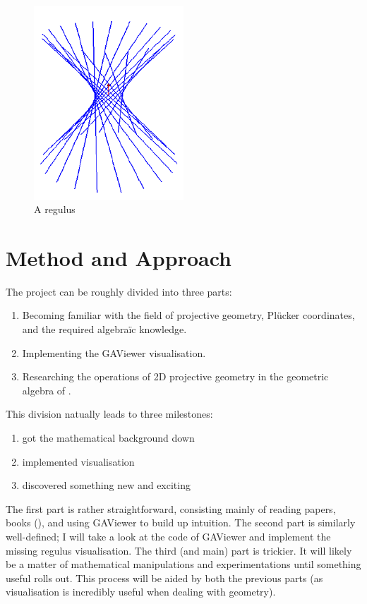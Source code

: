 \documentclass[a4paper, 10pt]{article}
\begin{document}
\begin{figure}[htbp]
  \centering
  \includegraphics[width=0.5\textwidth]{regulus.png}
  \caption{A regulus}
  \label{fig:regulus}
\end{figure}

\section{Method and Approach}
The project can be roughly divided into three parts:
\begin{enumerate}
\item Becoming familiar with the field of projective geometry, Pl\"{u}cker
  coordinates, and the required algebra\"{i}c knowledge.
\item Implementing the GAViewer visualisation.
\item Researching the operations of 2D projective geometry in the geometric
  algebra of \rp.
\end{enumerate}
This division natually leads to three milestones:
\begin{enumerate}
\item got the mathematical background down
\item implemented visualisation
\item discovered something new and exciting
\end{enumerate}

The first part is rather straightforward, consisting mainly of reading papers,
books (\cite{dorst2009geometric}), and using GAViewer to build up intuition.
The second part is similarly well-defined; I will take a look at the code of
GAViewer and implement the missing regulus visualisation. The third (and main)
part is trickier. It will likely be a matter of mathematical manipulations and
experimentations until something useful rolls out. This process will be aided by
both the previous parts (as visualisation is incredibly useful when dealing with
geometry).
\end{document}
